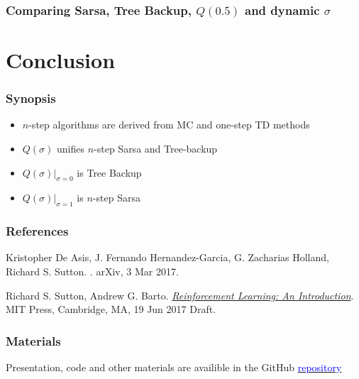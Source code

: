 \documentclass{beamer}
\begin{document}
\begin{frame}
  \frametitle{Comparing Sarsa, Tree Backup, $Q(0.5)$ and dynamic $\sigma$}
\end{frame}

\section{Conclusion}

\begin{frame}
  \frametitle{Synopsis}
  \begin{itemize}
    \item $n$-step algorithms are derived from MC and one-step TD methods
    \item $Q(\sigma)$ unifies $n$-step Sarsa and Tree-backup
    \item $Q(\sigma)|_{\sigma=0}$ is Tree Backup
    \item $Q(\sigma)|_{\sigma=1}$ is $n$-step Sarsa
  \end{itemize}
\end{frame}

\begin{frame}
  \frametitle<presentation>{References}

  \begin{thebibliography}{10}

  \beamertemplatebookbibitems

  \beamertemplatearticlebibitems

    Kristopher De Asis, J. Fernando Hernandez-Garcia, G. Zacharias Holland,
    Richard S. Sutton.
    .
    \newblock arXiv, 3 Mar 2017.

   Richard S. Sutton, Andrew G. Barto.
    \newblock
    {\href{http://incompleteideas.net/sutton/book/the-book-2nd.html}{\em
      Reinforcement Learning: An Introduction}}.
    \newblock MIT Press, Cambridge, MA, 19 Jun 2017 Draft.

  \end{thebibliography}
\end{frame}


\begin{frame}
  \frametitle{Materials}
  \begin{center}
  Presentation, code and other materials are availible in the GitHub
  \href{https://github.com/omtcyfz/talks/tree/master/n-step-q-sigma}{
    \textcolor{blue}{repository}}
  \end{center}
\end{frame}

\end{document}
